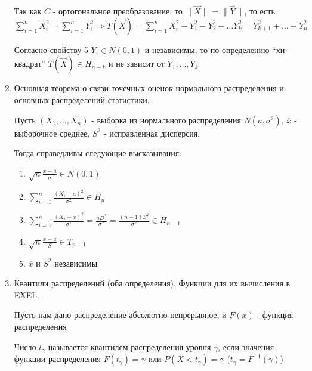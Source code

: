 \documentclass[12pt]{article}
\begin{document}
\begin{enumerate}
    \begin{MyProof}
        Так как $C$ - ортогональное преобразование, то $\|\vec X\| = \|\vec Y\|$, то есть $\sum_{i = 1}^n X^2_i = \sum_{i = 1}^n Y^2_i \Longrightarrow
        T(\vec X) = \sum_{i = 1}^n X_i^2 - Y_1^2 - Y_2^2 - \dots Y_k^2 = Y^2_{k + 1} + \dots + Y^2_{n}$

        Согласно свойству 5 $Y_i \in N(0, 1)$ и независимы, то по определению \enquote{хи-квадрат} $T(\vec X) \in H_{n - k}$ и не зависит от $Y_1, \dots, Y_k$
    \end{MyProof}

    \item Основная теорема о связи точечных оценок нормального распределения и основных распределений статистики.

    \begin{MyTheorem}
        \Ths Пусть $(X_1, \dots, X_n)$ - выборка из нормального распределения $N(a, \sigma^2)$, $\overline{x}$ - выборочное среднее, $S^2$ - исправленная дисперсия.

        Тогда справедливы следующие высказывания:

        \begin{enumerate}
            \item $\sqrt{n} \frac{\overline{x} - a}{\sigma} \in N(0, 1)$
            
            \item $\sum_{i = 1}^n \frac{(X_i - a)^2}{\sigma^2} \in H_n$
            
            \item $\sum_{i = 1}^n \frac{(X_i - \overline{x})^2}{\sigma^2} = \frac{n D^*}{\sigma^2} = \frac{(n - 1) S^2}{\sigma^2} \in H_{n - 1}$

            \item $\sqrt{n} \frac{\overline{x} - a}{S} \in T_{n - 1}$
            
            \item $\overline{x}$ и $S^2$ независимы
        \end{enumerate}
    \end{MyTheorem}

    \item Квантили распределений (оба определения). Функции для их вычисления в EXEL.

    Пусть нам дано распределение абсолютно непрерывное, и $F(x)$ - функция распределения

     Число $t_\gamma$ называется \hyperlink{quantile_distribution}{квантилем распределения} уровня $\gamma$, если значения
    функции распределения $F(t_\gamma) = \gamma$ или $P(X < t_\gamma) = \gamma$ ($t_\gamma = F^{-1}(\gamma)$)


\end{enumerate}
\end{document}
